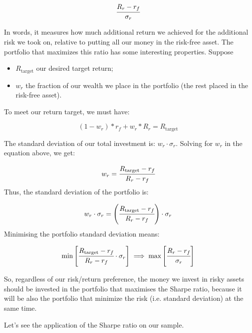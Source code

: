 \begin{equation} \cfrac{R_r - r_f}{\sigma_r} \end{equation}

In words, it measures how much additional return we achieved for the
additional risk we took on, relative to putting all our money in the
risk-free asset. The portfolio that maximizes this ratio has some interesting properties. Suppose

\begin{itemize}
\tightlist
\item
  \(R_\textrm{target}\) our desired target return;
\item
  \(w_r\) the fraction of our wealth we place in the portfolio (the
  rest placed in the risk-free asset).
\end{itemize}

To meet our return target, we must have:

\begin{equation*} 
	(1 - w_r) * r_f + w_r * R_r =R_\textrm{target} 
\end{equation*}

The standard deviation of our total investment is:
\(w_r\cdot \sigma_r\). Solving for \(w_r\) in the equation above, we
get:

\begin{equation*} 
	w_r = \cfrac{R_\textrm{target} - r_f}{R_r - r_f} 
\end{equation*}
Thus, the standard deviation of the portfolio is:

\begin{equation*} 
	w_r\cdot \sigma_r = \left(\cfrac{R_\textrm{target} - r_f}{R_r - r_f}\right)\cdot \sigma_r 
\end{equation*}
Minimising the portfolio standard deviation means:

\begin{equation} 
	\textrm{min}\left[\cfrac{R_\textrm{target} - r_f}{R_r - r_f}\cdot \sigma_r\right]\implies\textrm{max}\left[\cfrac{R_r - r_f}{\sigma_r}\right]
\end{equation}

So, regardless of our risk/return preference, the money we invest in
risky assets should be invested in the portfolio that maximises
the Sharpe ratio, because it will be also the portfolio that minimize 
the risk (i.e. standard deviation) at the same time.

Let's see the application of the Sharpe ratio on our sample.

